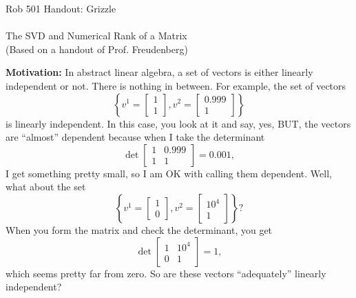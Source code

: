 \documentclass[letterpaper]{article}
\begin{document}

\baselineskip=48pt

\setlength{\parskip}{.3in}
\setlength{\itemsep}{.3in}

\pagestyle{plain}

{\Large \bf
\begin{center}
Rob 501 Handout: Grizzle \\
\mbox{} \\
The SVD and Numerical Rank of a Matrix\\
(Based on a handout of Prof. Freudenberg)
\end{center}
}



\Large


\noindent \textbf{Motivation:} In abstract linear algebra, a set of vectors is either linearly independent or not. There is nothing in between. For example, the set of vectors
$$\left\{ v^1 =  \left[ \begin{array}{l} 1 \\1 \end{array} \right] ,  v^2 =  \left[ \begin{array}{l} 0.999 \\1\end{array} \right] \right\}$$
is linearly independent. In this case, you look at it and say, yes, BUT, the vectors are ``almost'' dependent because when I take the determinant
$$ \det  \left[ \begin{array}{ll} 1 & 0.999 \\1 & 1\end{array} \right] = 0.001,$$
I get something pretty small, so I am OK with calling them dependent. Well, what about the set
$$\left\{ v^1 =  \left[ \begin{array}{l} 1 \\0 \end{array} \right] ,  v^2 =  \left[ \begin{array}{l} 10^4 \\1 \end{array} \right] \right\} ?$$
When you form the matrix and check the determinant, you get
$$ \det  \left[ \begin{array}{ll} 1 & 10^4 \\0& 1\end{array} \right] = 1,$$
which seems pretty far from zero. So are these vectors ``adequately'' linearly independent?
\end{document}
